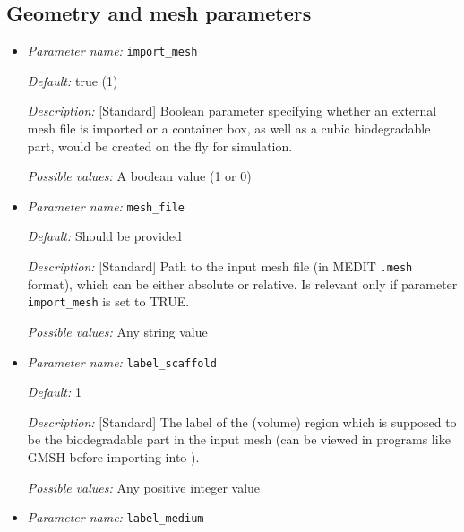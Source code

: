 \subsection{Geometry and mesh parameters}
\label{parameters:mesh}

\begin{itemize}

\item {\it Parameter name:} {\tt import\_mesh}
\label{parameters:import_mesh}


{\it Default:} true (1)

{\it Description:} [Standard] Boolean parameter specifying whether an external mesh file is imported or a container box, as well as a cubic biodegradable part, would be created on the fly for simulation.

{\it Possible values:} A boolean value (1 or 0)

\item {\it Parameter name:} {\tt mesh\_file}
\label{parameters:mesh_file}


{\it Default:} Should be provided

{\it Description:} [Standard] Path to the input mesh file (in MEDIT {\tt .mesh} format), which can be either absolute or relative. Is relevant only if parameter {\tt import\_mesh} is set to TRUE.

{\it Possible values:} Any string value


\item {\it Parameter name:} {\tt label\_scaffold}
\label{parameters:label_scaffold}


{\it Default:} 1

{\it Description:} [Standard] The label of the (volume) region which is supposed to be the biodegradable part in the input mesh (can be viewed in programs like GMSH before importing into \biodeg{}).

{\it Possible values:} Any positive integer value


\item {\it Parameter name:} {\tt label\_medium}
\label{parameters:label_medium}


\end{itemize}

